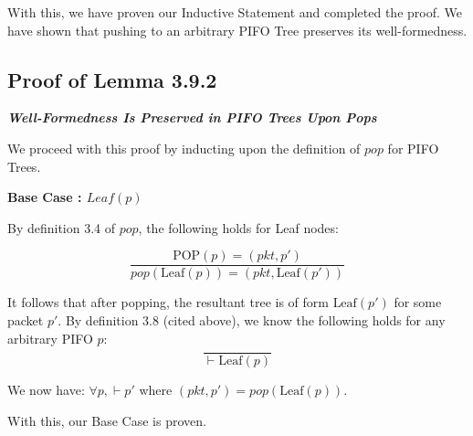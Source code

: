 \documentclass{article}
\begin{document}
\noindent With this, we have proven our Inductive Statement and completed the proof. We have shown that pushing to an arbitrary PIFO Tree preserves its well-formedness.\\[-10pt]

\subsection{Proof of Lemma 3.9.2}
\noindent \textit{\textbf{Well-Formedness Is Preserved in PIFO Trees Upon Pops}}\newline

\noindent We proceed with this proof by inducting upon the definition of $pop$ for PIFO Trees.\newline

\noindent \textbf{Base Case : $Leaf(p)$}\newline

\noindent By definition 3.4 of $pop$, the following holds for Leaf nodes:

$$\frac{\text{POP}(p) = (pkt, p')}{pop(\text{Leaf}(p)) = (pkt, \text{Leaf}(p'))}$$

\noindent It follows that after popping, the resultant tree is of form $\text{Leaf}(p')$ for some packet $p'$. By definition 3.8 (cited above), we know the following holds for any arbitrary PIFO $p$:\\[-10pt]

$$\frac{}{\vdash \text{Leaf}(p)}$$

\noindent We now have: $\forall p, \vdash p'$ where $(pkt, p') = pop(\text{Leaf}(p))$.\newline

\noindent With this, our Base Case is proven.
\end{document}
